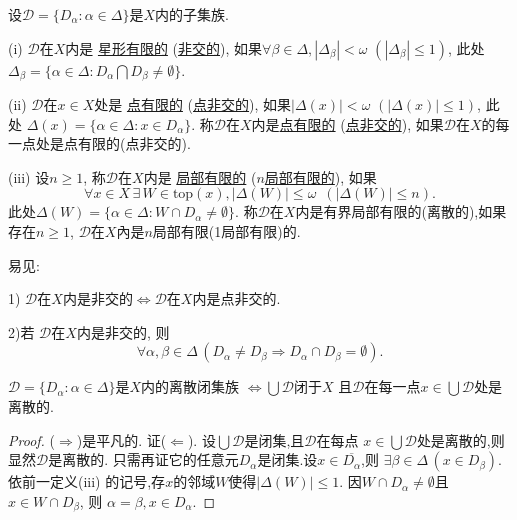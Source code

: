 \documentclass[main.tex]{subfiles}
\begin{document}
\begin{definition} \label{def:1.2.4}
设$\mathscr{D}=\{D_\alpha: \alpha\in \Delta\}$是$X$内的子集族.

\textnormal{(i)} $\mathscr{D}$在$X$内是
\underline{星形有限的}
(\underline{非交的}),
如果$\forall\beta\in\Delta, |\Delta_\beta| < \omega$ $(|\Delta_\beta| \le 1)$, 此处
$\Delta_\beta = \{\alpha\in\Delta: D_\alpha\bigcap D_\beta \ne \emptyset\}$.
 
\textnormal{(ii)} $\mathscr{D}$在$x\in X$处是
\underline{点有限的}
(\underline{点非交的}),
如果$|\Delta(x)| < \omega$ $(|\Delta(x)| \le 1)$, 此处
$\Delta(x) = \{\alpha\in\Delta: x\in D_\alpha\}$.
称$\mathscr{D}$在$X$内是\underline{点有限的}
(\underline{点非交的}), 如果$\mathscr{D}$在$X$的每一点处是点有限的\textnormal{(}点非交的\textnormal{)}.

(iii) 设$n\ge 1$, 称$\mathscr{D}$在$X$内是
\underline{局部有限的}
(\underline{$n$局部有限的}),
如果
$$\forall x\in X\, \exists\,W\in\textrm{top}(x), |\Delta(W)| \le \omega\,\,\, (|\Delta(W)| \le n).$$
此处$\Delta(W)= \{\alpha\in \Delta: W\cap D_\alpha \ne \emptyset\}$.
称$\mathscr{D}$在$X$内是有界局部有限的(离散的),如果存在$n\ge 1$, 
$\mathscr{D}$在$X$內是$n$局部有限(1局部有限)的.
\end{definition}

易见:

1) $\mathscr{D}$在$X$内是非交的$\Leftrightarrow$$\mathscr{D}$在$X$内是点非交的.

2)若 $\mathscr{D}$在$X$内是非交的, 则
$$\forall \alpha,\beta\in\Delta \,(D_\alpha \ne D_\beta
\Rightarrow D_\alpha\cap D_\beta = \emptyset).$$

\begin{fact} \label{fact:1.2.5}
$\mathscr{D}=\{D_\alpha: \alpha\in \Delta\}$是$X$内的离散闭集族
$\Leftrightarrow\bigcup\mathscr{D}$闭于$X$ 
且$\mathscr{D}$在每一点$x\in\bigcup\mathscr{D}$处是离散的.
\end{fact}
\begin{proof}
($\Rightarrow$)是平凡的.
证($\Leftarrow$). 设$\bigcup\mathscr{D}$是闭集,且$\mathscr{D}$在每点
$x\in\bigcup\mathscr{D}$处是离散的,则显然$\mathscr{D}$是离散的.
只需再证它的任意元$D_\alpha$是闭集.设$x\in\overline{D_\alpha}$,则
$\exists\beta\in\Delta \, (x\in D_\beta)$.
依前一定义(iii) 的记号,存$x$的邻域$W$使得$|\Delta(W)|\le 1$. 
因$W\cap D_\alpha \ne \emptyset$且$x\in W\cap D_\beta$, 则
$\alpha = \beta, x\in D_\alpha$.
\end{proof}
\end{document}
